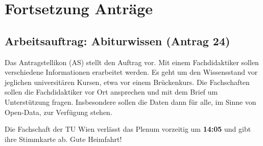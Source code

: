 \section{Fortsetzung Anträge}
  \subsection{Arbeitsauftrag: Abiturwissen (Antrag 24)}
    Das Antragstellikon (AS) stellt den Auftrag vor.
    Mit einem Fachdidaktiker sollen verschiedene Informationen erarbeitet werden.
    Es geht um den Wissensstand vor jeglichen universitären Kursen, etwa vor einem Brückenkurs.
    Die Fachschaften sollen die Fachdidaktiker vor Ort ansprechen und mit dem Brief um Unterstützung fragen.
    Insbesondere sollen die Daten dann für alle, im Sinne von Open-Data, zur Verfügung stehen.

    \begin{info}{}
      Die Fachschaft der TU Wien verlässt das Plenum vorzeitig um \textbf{14:05} und gibt ihre Stimmkarte ab. Gute Heimfahrt!
    \end{info}

